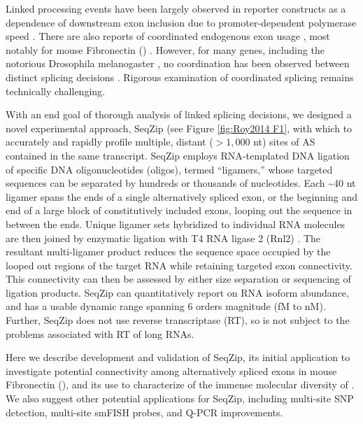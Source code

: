 {	Linked processing events have been largely observed in reporter constructs as a dependence of downstream exon inclusion due to promoter-dependent polymerase speed \citep{Kornblihtt2013}. There are also reports of coordinated endogenous exon usage \citep{Fagnani2007}, most notably for mouse Fibronectin (\fn{}) \citep{Fededa2005}. However, for many genes, including the notorious Drosophila melanogaster \dscam{}, no coordination has been observed between distinct splicing decisions \citep{Miura2013b,Sun2013}. Rigorous examination of coordinated splicing remains technically challenging.

	With an end goal of thorough analysis of linked splicing decisions, we designed a novel experimental approach, SeqZip (see Figure \ref{fig:Roy2014 F1}, with which to accurately and rapidly profile multiple, distant ($>1,000$ nt) sites of AS contained in the same transcript. SeqZip employs RNA-templated DNA ligation of specific DNA oligonucleotides (oligos), termed ``ligamers,'' whose targeted sequences can be separated by hundreds or thousands of nucleotides. Each \textasciitilde 40 nt ligamer spans the ends of a single alternatively spliced exon, or the beginning and end of a large block of constitutively included exons, looping out the sequence in between the ends. Unique ligamer sets hybridized to individual RNA molecules are then joined by enzymatic ligation with T4 RNA ligase 2 (Rnl2) \citep{Ho2002b}. The resultant multi-ligamer product reduces the sequence space occupied by the looped out regions of the target RNA while retaining targeted exon connectivity. This connectivity can then be assessed by either size separation or sequencing of ligation products. SeqZip can quantitatively report on RNA isoform abundance, and has a usable dynamic range spanning 6 orders magnitude (fM to nM). Further, SeqZip does not use reverse transcriptase (RT), so is not subject to the problems associated with RT of long RNAs.

	Here we describe development and validation of SeqZip, its initial application to investigate potential connectivity among alternatively spliced exons in mouse Fibronectin (\fn{}), and its use to characterize of the immense molecular diversity of \dscam{}. We also suggest other potential applications for SeqZip, including multi-site SNP detection, multi-site smFISH probes, and Q-PCR improvements.

}
